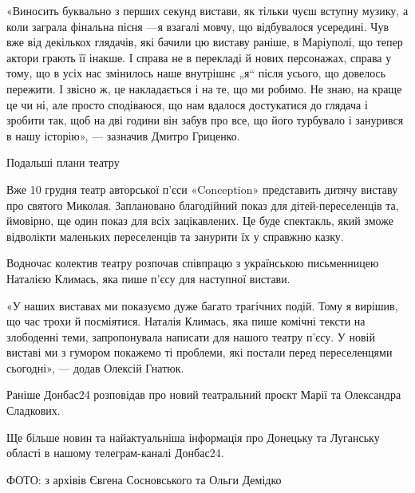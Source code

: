«Виносить буквально з перших секунд вистави, як тільки чуєш вступну музику, а
коли заграла фінальна пісня —я взагалі мовчу, що відбувалося усередині. Чув вже
від декількох глядачів, які бачили цю виставу раніше, в Маріуполі, що тепер
актори грають її інакше. І справа не в перекладі й нових персонажах, справа у
тому, що в усіх нас змінилось наше внутрішнє „я“ після усього, що довелось
пережити. І звісно ж, це накладається і на те, що ми робимо. Не знаю, на краще
це чи ні, але просто сподіваюся, що нам вдалося достукатися до глядача і
зробити так, щоб на дві години він забув про все, що його турбувало і занурився
в нашу історію», — зазначив Дмитро Гриценко.

Подальші плани театру

Вже 10 грудня театр авторської п'єси «Conception» представить дитячу виставу
про святого Миколая. Заплановано благодійний показ для дітей-переселенців та,
ймовірно, ще один показ для всіх зацікавлених. Це буде спектакль, який зможе
відволікти маленьких переселенців та занурити їх у справжню казку.

Водночас колектив театру розпочав співпрацю з українською письменницею Наталією
Климась, яка пише п'єсу для наступної вистави.

«У наших виставах ми показуємо дуже багато трагічних подій. Тому я вирішив, що
час трохи й посміятися. Наталія Климась, яка пише комічні тексти на злободенні
теми, запропонувала написати для нашого театру п'єсу. У новій виставі ми з
гумором покажемо ті проблеми, які постали перед переселенцями сьогодні», —
додав Олексій Гнатюк.

Раніше Донбас24 розповідав про новий театральний проєкт Марії та Олександра
Сладкових.

Ще більше новин та найактуальніша інформація про Донецьку та Луганську області
в нашому телеграм-каналі Донбас24.

ФОТО: з архівів Євгена Сосновського та Ольги Демідко
